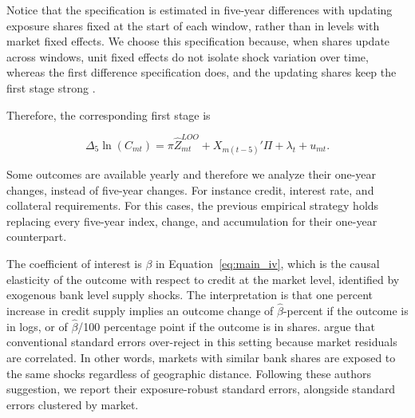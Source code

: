 \documentclass[12pt]{article}
\begin{document}
Notice that the specification is estimated in five-year differences with updating exposure shares fixed at the start of each window, rather than in levels with market fixed effects. We choose this specification because, when shares update across windows, unit fixed effects do not isolate shock variation over time, whereas the first difference specification does, and the updating shares keep the first stage strong \citep{borusyak2022quasi}.

Therefore, the corresponding first stage is

\begin{equation}
    \Delta_5 \ln(C_{mt}) = \pi \hat{Z}_{mt}^{LOO} + X_{m(t-5)}'\Pi + \lambda_t + u_{mt}.
    \label{eq:first_stage}
\end{equation}

Some outcomes are available yearly and therefore we analyze their one-year changes, instead of five-year changes. For instance credit, interest rate, and collateral requirements. For this cases, the previous empirical strategy holds replacing every five-year index, change, and accumulation for their one-year counterpart. 

The coefficient of interest is $\beta$ in Equation~\ref{eq:main_iv}, which is the causal elasticity of the outcome with respect to credit at the market level, identified by exogenous bank level supply shocks. The interpretation is that one percent increase in credit supply implies an outcome change of $\hat{\beta}$-percent if the outcome is in logs, or of $\hat{\beta}$/100 percentage point if the outcome is in shares. \citet{adao2019shiftshare} argue that conventional standard errors over-reject in this setting because market residuals are correlated. In other words, markets with similar bank shares are exposed to the same shocks regardless of geographic distance. Following these authors suggestion, we report their exposure-robust standard errors, alongside standard errors clustered by market. 



\end{document}
